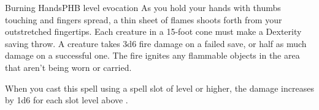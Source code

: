 \begin{spell}{Burning Hands}{PHB}{ level evocation}
{
}
As you hold your hands with thumbs touching and fingers
spread, a thin sheet of flames shoots forth from your
outstretched fingertips. Each creature in a 15-foot cone
must make a Dexterity saving throw. A creature takes 3d6
fire damage on a failed save, or half as much damage on
a successful one. The fire ignites any flammable objects
in the area that aren't being worn or carried.

 When you cast this spell using a
spell slot of  level or higher, the damage increases
by 1d6 for each slot level above .
\end{spell}
